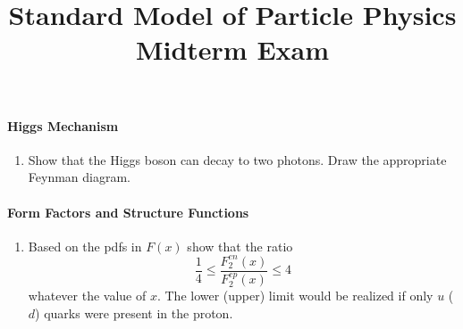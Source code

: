\documentclass[letterpaper,11pt]{article}
\title{Standard Model of Particle Physics \\ Midterm Exam}
\begin{document}
\maketitle

\paragraph*{Higgs Mechanism}
\begin{enumerate}
  \item Show that the Higgs boson can decay to two photons. Draw the appropriate Feynman diagram.
\end{enumerate}

\paragraph*{Form Factors and Structure Functions}
\begin{enumerate}
  \item Based on the pdfs in $F(x)$ show that the ratio
  \begin{equation*}
    \frac{1}{4} \le \frac{F_2^{en}(x)}{F_2^{ep}(x)} \le 4
  \end{equation*}
  whatever the value of $x$. The lower (upper) limit would be realized if only $u$ ($d$) quarks were present in the proton.
\end{enumerate}
\end{document}
